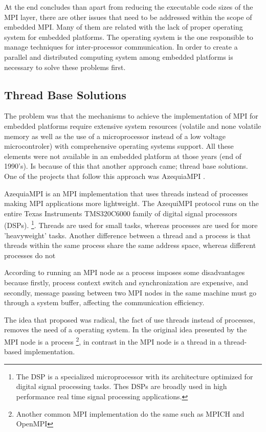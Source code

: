 At the end \cite{McMahon} concludes than apart from  reducing the executable
code sizes of the MPI layer, there are other issues that need
to be addressed within the scope of embedded MPI. Many of them are related with
the lack of proper operating system for embedded platforms. The operating
system is the one responsible to manage techniques for inter-processor
communication.  In order to create a parallel and distributed computing system
among embedded platforms is necessary to solve these problems first.


\subsection{Thread Base Solutions}

The problem was that the mechanisms to achieve the implementation of MPI for
embedded platforms require extensive system resources (volatile and none
volatile memory as well as the use of a microprocessor instead of a low voltage
microcontroler) with comprehensive operating systems support. All these
elements were not available in an embedded platform at those years (end of
1990's). Is because of this that another approach came; thread base solutions.
One of the projects that follow this approach was AzequiaMPI \cite{Gallego}.

AzequiaMPI is an MPI implementation that uses threads instead of processes
making MPI applications more lightweight. The AzequiMPI protocol runs on the
entire Texas Instruments TMS320C6000 family of digital signal processors
(DSPs). \footnote{The DSP is a specialized microprocessor
with its architecture optimized for digital signal processing tasks. Thes DSPs
are broadly used in high performance real time signal processing
applications.}. Threads are used for small tasks, whereas processes are used
for more 'heavyweight' tasks. Another
difference between a thread and a process is that threads within the same
process share the same address space, whereas different processes do not

According to \cite{Gallego} running an MPI node as a process imposes some
disadvantages because firstly, process context switch and synchronization are
expensive, and secondly, message passing between two MPI nodes in the same
machine must go through a system buffer, affecting  the communication
efficiency. 

The idea that \cite{Gallego} proposed was radical, the fact of use threads
instead of processes, removes the need of a operating system. In the original
idea presented by \cite{Salim} the MPI node  is a process \footnote{Another
common  MPI implementation do the same such as MPICH and OpenMPI},  in contrast
in \cite{Gallego} the MPI node is a thread in a thread-based implementation.

